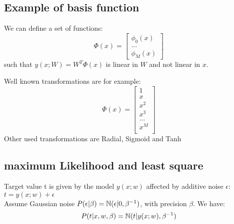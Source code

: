 \subsection{Example of basis function}
We can define a set of functions:
\begin{equation}
    \Phi(x) = \begin{bmatrix}
                \phi_{0}(x)\\
                \dots \\
                \phi_{M}(x)
                \end{bmatrix}
\end{equation}
such that $y(x;W) = W^{T}\Phi(x)$ is linear in $W$ and not linear in $x$.

Well known transformations are for example:
\begin{equation}
    \Phi(x) = \begin{bmatrix}
                1\\
                x \\
                x^{2} \\
                x^{3} \\
                \dots \\
                x^{M} \\
                \end{bmatrix}
\end{equation}
Other used transformations are Radial, Sigmoid and Tanh

\subsection{maximum Likelihood and least square}

Target value t is given by the model $y(x; w)$ affected by additive noise $\epsilon$: $t = y(x;w) + \epsilon$\\
Assume Gaussian noise $P(\epsilon|\beta) = \mathbb{N}(\epsilon|0, \beta ^{-1})$, with precision $\beta$. We have:
\begin{equation}
    P(t|x,w,\beta) = \mathbb{N}(t|y(x;w),\beta ^{-1})
\end{equation}

